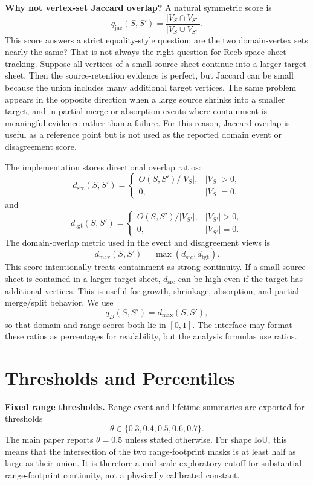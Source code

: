 \documentclass{vgtc}
\newcommand{\Sheet}{S}
\newcommand{\myparagraph}[1]{\vspace{1mm} \noindent \textbf{#1}}
\begin{document}
\myparagraph{Why not vertex-set Jaccard overlap?}
A natural symmetric score is
$$
q_\mathrm{jac}(\Sheet,\Sheet')=
\frac{|V_\Sheet\cap V_{\Sheet'}|}{|V_\Sheet\cup V_{\Sheet'}|}.
$$
This score answers a strict equality-style question: are the two domain-vertex sets nearly the same? That is not always the right question for Reeb-space sheet tracking. Suppose all vertices of a small source sheet continue into a larger target sheet. Then the source-retention evidence is perfect, but Jaccard can be small because the union includes many additional target vertices. The same problem appears in the opposite direction when a large source shrinks into a smaller target, and in partial merge or absorption events where containment is meaningful evidence rather than a failure. For this reason, Jaccard overlap is useful as a reference point but is not used as the reported domain event or disagreement score.

The implementation stores directional overlap ratios:
$$
d_\mathrm{src}(\Sheet,\Sheet')=
\begin{cases}
O(\Sheet,\Sheet')/|V_\Sheet|, & |V_\Sheet|>0,\\
0, & |V_\Sheet|=0,
\end{cases}
$$
and
$$
d_\mathrm{tgt}(\Sheet,\Sheet')=
\begin{cases}
O(\Sheet,\Sheet')/|V_{\Sheet'}|, & |V_{\Sheet'}|>0,\\
0, & |V_{\Sheet'}|=0.
\end{cases}
$$
The domain-overlap metric used in the event and disagreement views is
$$
d_\mathrm{max}(\Sheet,\Sheet')=\max(d_\mathrm{src},d_\mathrm{tgt}).
$$
This score intentionally treats containment as strong continuity. If a small source sheet is contained in a larger target sheet, $d_\mathrm{src}$ can be high even if the target has additional vertices. This is useful for growth, shrinkage, absorption, and partial merge/split behavior. We use
$$
q_D(\Sheet,\Sheet')=d_\mathrm{max}(\Sheet,\Sheet'),
$$
so that domain and range scores both lie in $[0,1]$. The interface may format these ratios as percentages for readability, but the analysis formulas use ratios.

\section{Thresholds and Percentiles}

\myparagraph{Fixed range thresholds.}
Range event and lifetime summaries are exported for thresholds
$$
\theta\in\{0.3,0.4,0.5,0.6,0.7\}.
$$
The main paper reports $\theta=0.5$ unless stated otherwise. For shape IoU, this means that the intersection of the two range-footprint masks is at least half as large as their union. It is therefore a mid-scale exploratory cutoff for substantial range-footprint continuity, not a physically calibrated constant.
\end{document}
